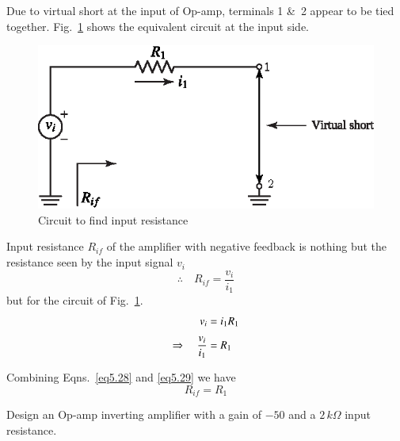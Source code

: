 \vfill\eject

Due to virtual short at the input of Op-amp, terminals 1 \&\ 2 appear to be tied together. Fig.~\ref{fig5.12} shows the equivalent circuit at the input side.
\begin{figure}[H]
\centering
\includegraphics{chap4/S3-EE-06-019.eps}
\smallskip
\caption{Circuit to find input resistance}\label{fig5.12}
\end{figure}

Input resistance $R_{if}$ of the amplifier with negative feedback is nothing but the resistance seen by the input signal $v_{i}$
\begin{equation}
\therefore\quad R_{if}=\frac{v_{i}}{i_{1}}\label{eq5.28}
\end{equation}
but for the circuit of Fig.~\ref{fig5.12}.
\begin{align}
v_{i} &= i_{1}R_{1}\notag\\[3pt]
\Rightarrow\quad \frac{v_{i}}{i_{1}} &= R_{1}\label{eq5.29}
\end{align}

Combining Eqns.~\eqref{eq5.28} and \eqref{eq5.29} we have
\begin{equation}
R_{if}=R_{1}\label{eq5.30}
\end{equation}

\begin{example}\label{exam5.16}
Design an Op-amp inverting amplifier with a gain of $-50$ and a $2\,k\Omega$ input resistance.
\end{example}

